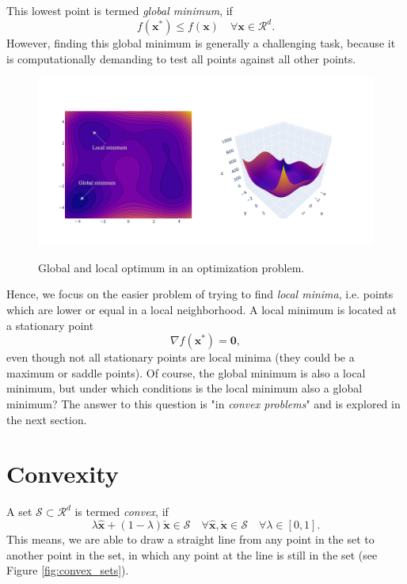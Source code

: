 This lowest point is termed \emph{global minimum}, if 
\begin{equation}
    f(\mathbf{x}^*) \le f(\mathbf{x})  \quad \forall \mathbf{x} \in \mathcal{R}^d.
\end{equation}
However, finding this global minimum is generally a challenging task, because it is computationally demanding to test all points against all other points. 

\begin{figure}
    \centering
    \includegraphics[width=\textwidth, alt={Optimization Landscape}]{figures/opti_landscape.png}
    \caption{Global and local optimum in an optimization problem.}
    \label{fig:global_local_optimization}
\end{figure}

Hence, we focus on the easier problem of trying to find \emph{local minima}, i.e. points which are lower or equal in a local neighborhood. A local minimum is located at a stationary point 
\begin{equation}
    \nabla f(\mathbf{x}^*) = \mathbf{0},
    \label{eq:stationary_point}
\end{equation}
even though not all stationary points are local minima (they could be a maximum or saddle points).
Of course, the global minimum is also a local minimum, but under which conditions is the local minimum also a global minimum? The answer to this question is "in \emph{convex problems}" and is explored in the next section.

\section{Convexity}
A set $\mathcal{S} \subset \mathcal{R}^d$ is termed \emph{convex}, if 
\begin{equation}
    \lambda \hat{\mathbf{x}} + (1-\lambda) \check{\mathbf{x}} \in \mathcal{S} \quad \forall \hat{\mathbf{x}}, \check{\mathbf{x}} \in \mathcal{S} \quad  \forall \lambda \in [0,1].
\end{equation}
This means, we are able to draw a straight line from any point in the set to another point in the set, in which any point at the line is still in the set (see Figure \ref{fig:convex_sets}).

